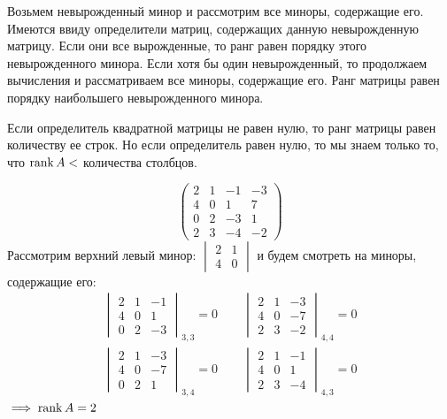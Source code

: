\documentclass[12pt, a4paper]{article}
\begin{document}
    Возьмем невырожденный минор и рассмотрим все миноры, содержащие его. Имеются ввиду определители матриц, содержащих данную невырожденную матрицу. Если они все вырожденные, то ранг равен порядку этого невырожденного минора. Если хотя бы один невырожденный, то продолжаем вычисления и рассматриваем все миноры, содержащие его. Ранг матрицы равен порядку наибольшего невырожденного минора.
    \begin{rem}
        Если определитель квадратной матрицы не равен нулю, то ранг матрицы равен количеству ее строк. Но если определитель равен нулю, то мы знаем только то, что \( \operatorname{rank} A <  \) количества столбцов.
        
    \end{rem}
    \begin{exmp}
        \[
            \begin{pmatrix} 2 & 1 & -1 & -3 \\ 4& 0 & 1 & 7 \\ 0 & 2 & -3 & 1 \\ 2 & 3 & -4 & -2 \end{pmatrix} 
        \]Рассмотрим верхний левый минор: \( \begin{vmatrix}
            2 & 1  \\ 4 & 0
        \end{vmatrix} \) и будем смотреть на миноры, содержащие его: 
        \begin{align*}
            \begin{vmatrix}
                2 & 1 & -1 \\ 4 & 0 & 1 \\ 0 & 2 & -3
            \end{vmatrix}_{3,3} = 0 \qquad
            \begin{vmatrix}
                2 & 1 & -3 \\ 4 & 0 & -7 \\ 2 & 3 & -2
            \end{vmatrix}_{4,4} = 0 \\
            \begin{vmatrix}
                2 & 1 & -3 \\ 4 & 0 & -7 \\ 0 & 2 & 1
            \end{vmatrix}_{3,4} = 0 \qquad
            \begin{vmatrix}
                2 & 1 & -1 \\ 4 & 0 & 1 \\ 2 & 3 & -4
            \end{vmatrix}_{4, 3} = 0
        \end{align*} \( \implies \operatorname{rank} A = 2 \)
        
    \end{exmp}
\end{document}
